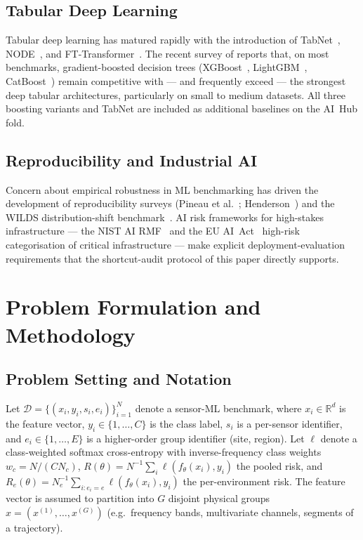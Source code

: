 \documentclass[3p,times,authoryear]{elsarticle}
\theoremstyle{remark}
\begin{document}
\subsection{Tabular Deep Learning}

Tabular deep learning has matured rapidly with the introduction
of TabNet~\cite{arik2021tabnet}, NODE~\cite{popov2020node}, and
FT-Transformer~\cite{gorishniy2021ftt}. The recent survey of
\citet{borisov2024tabsurvey} reports that, on most benchmarks,
gradient-boosted decision trees (XGBoost~\cite{chen2016xgboost},
LightGBM~\cite{ke2017lightgbm},
CatBoost~\cite{prokhorenkova2018catboost}) remain competitive
with --- and frequently exceed --- the strongest deep tabular
architectures, particularly on small to medium datasets. All
three boosting variants and TabNet are included as additional
baselines on the AI~Hub fold.

\subsection{Reproducibility and Industrial AI}

Concern about empirical robustness in ML benchmarking has driven
the development of reproducibility surveys (Pineau et
al.~\cite{pineau2021reproducibility};
Henderson~\cite{henderson2018reproducibility}) and the WILDS
distribution-shift benchmark~\cite{koh2021wilds}. AI risk
frameworks for high-stakes infrastructure --- the NIST AI
RMF~\cite{nist2023airmf} and the EU AI~Act~\cite{eu2024aiact}
high-risk categorisation of critical infrastructure ---
make explicit deployment-evaluation requirements that the
shortcut-audit protocol of this paper directly supports.

\section{Problem Formulation and Methodology}\label{sec:methodology}

\subsection{Problem Setting and Notation}

Let $\mathcal{D} = \{(x_i, y_i, s_i, e_i)\}_{i=1}^{N}$ denote a
sensor-ML benchmark, where $x_i \in \mathbb{R}^{d}$ is the
feature vector, $y_i \in \{1,\dots,C\}$ is the class label,
$s_i$ is a per-sensor identifier, and
$e_i \in \{1,\dots,E\}$ is a higher-order group identifier
(site, region). Let $\ell$ denote a class-weighted softmax
cross-entropy with inverse-frequency class weights
$w_c = N / (CN_c)$, $R(\theta) = N^{-1}\sum_i \ell(f_\theta(x_i),
y_i)$ the pooled risk, and
$R_e(\theta) = N_e^{-1}\sum_{i:e_i=e} \ell(f_\theta(x_i), y_i)$
the per-environment risk. The feature vector is assumed to partition
into $G$ disjoint physical groups
$x = (x^{(1)}, \dots, x^{(G)})$ (e.g.\ frequency bands,
multivariate channels, segments of a trajectory).
\end{document}
